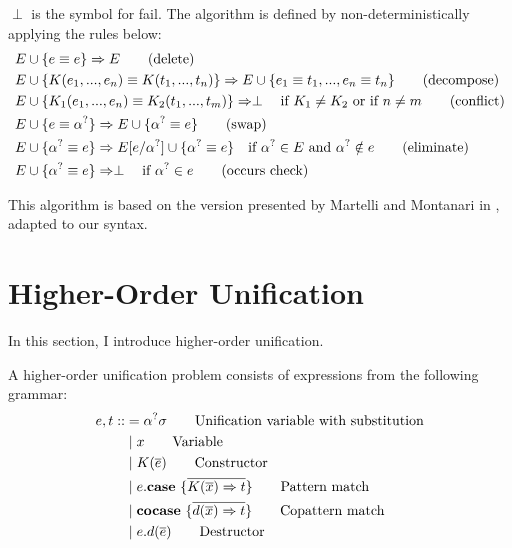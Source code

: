 \documentclass[twoside,12pt,a4paper]{article}
\begin{document}
\begin{definition}
    $\perp$ is the symbol for fail.
    The algorithm is defined by non-deterministically applying the rules below:
    \begin{align*}
        E & \cup \{ e \equiv e\} \Rightarrow E \tag{delete}\\
        E & \cup \{K(e_1, ..., e_n) \equiv K(t_1, ..., t_n)\} \Rightarrow E \cup \{e_1 \equiv t_1, ..., e_n \equiv t_n\}\tag{decompose}\\
        E & \cup \{K_1(e_1,..., e_n) \equiv K_2(t_1, ..., t_m)\}  \Rightarrow \perp \quad\text{if $K_1 \neq K_2$ or if $n\neq m$} \tag{conflict}\\
        E & \cup \{e \equiv \alpha^?\} \Rightarrow E \cup \{\alpha^? \equiv e\}\tag{swap}\\ 
        E & \cup \{\alpha^? \equiv e\} \Rightarrow E[e/\alpha^?] \cup \{\alpha^? \equiv e\} \quad\text{if $\alpha^? \in E$ and $\alpha^? \notin e$}  \tag{eliminate}\\
        E & \cup \{\alpha^? \equiv e\}\Rightarrow \perp \quad \text{if $\alpha^? \in e$} \tag{occurs check} \label{a}
    \end{align*}
\end{definition}

This algorithm is based on the version presented by Martelli and Montanari in \cite{10.1145/357162.357169},
adapted to our syntax.

\section{Higher-Order Unification}\label{sec:Higher-Order Unification}

In this section, I introduce higher-order unification.

\begin{definition}
    A higher-order unification problem consists of expressions from the following grammar:
    \begin{align*}
        e,t  ::&= \alphaunifvar\sigma \tag*{Unification variable with substitution}\\ %
            &\partition x  \tag*{Variable} \\
            &\partition\constructor \tag*{Constructor} \\
            &\partition\patmatch  \tag*{Pattern match}\\
            &\partition\copatmatch  \tag*{Copattern match}\\
            &\partition\destructor  \tag*{Destructor}
    \end{align*}
\end{definition}
\end{document}
